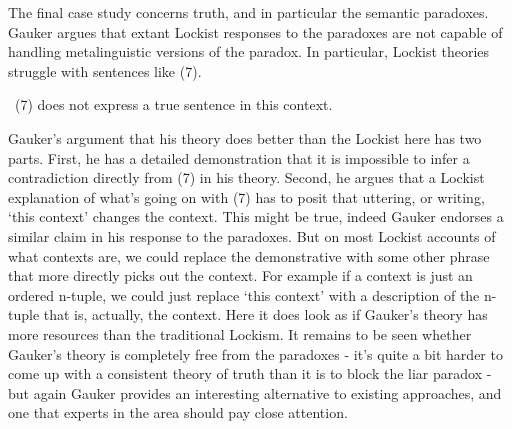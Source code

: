 \documentclass[
  10pt,
  letterpaper,
  DIV=11,
  numbers=noendperiod,
  twoside]{scrartcl}
\providecommand{\tightlist}{%
  \setlength{\itemsep}{0pt}\setlength{\parskip}{0pt}}\usepackage{longtable,booktabs,array}
\begin{document}
The final case study concerns truth, and in particular the semantic
paradoxes. Gauker argues that extant Lockist responses to the paradoxes
are not capable of handling metalinguistic versions of the paradox. In
particular, Lockist theories struggle with sentences like (7).

\begin{description}
\tightlist
\item[(7)]
~(7) does not express a true sentence in this context.
\end{description}

Gauker's argument that his theory does better than the Lockist here has
two parts. First, he has a detailed demonstration that it is impossible
to infer a contradiction directly from (7) in his theory. Second, he
argues that a Lockist explanation of what's going on with (7) has to
posit that uttering, or writing, `this context' changes the context.
This might be true, indeed Gauker endorses a similar claim in his
response to the paradoxes. But on most Lockist accounts of what contexts
are, we could replace the demonstrative with some other phrase that more
directly picks out the context. For example if a context is just an
ordered n-tuple, we could just replace `this context' with a description
of the n-tuple that is, actually, the context. Here it does look as if
Gauker's theory has more resources than the traditional Lockism. It
remains to be seen whether Gauker's theory is completely free from the
paradoxes - it's quite a bit harder to come up with a consistent theory
of truth than it is to block the liar paradox - but again Gauker
provides an interesting alternative to existing approaches, and one that
experts in the area should pay close attention.
\end{document}
